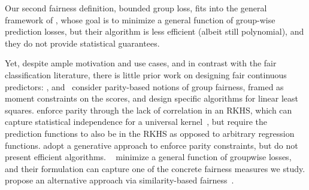 \documentclass{article}
\begin{document}
Our second fairness definition, bounded group loss, fits into the general framework
of \citet{alabi2018unleashing}, whose goal is to minimize a general function of group-wise prediction losses, but their algorithm is less efficient (albeit still polynomial), and they do not provide statistical guarantees.

%

\iffalse
Yet, despite ample motivation and use cases, and in contrast with the fair classification literature, there is little prior work on designing fair continuous predictors: \citet{CaldersEtAl13},  \citet{johnson2016impartial} and~\citet{komiyama2018nonconvex} consider parity-based notions of group fairness, framed as moment constraints on the scores, and design specific algorithms for linear least squares. \citet{perez2017fair} enforce parity through the lack of correlation in an RKHS, which can capture statistical independence for a universal kernel~\citep{gretton2005measuring}, but require the prediction functions to also be in the RKHS as opposed to arbitrary regression functions. \citet{fukuchi2015prediction} adopt a generative approach to enforce parity constraints, but do not present efficient algorithms. ~\citet{alabi2018unleashing} minimize a general function of groupwise losses, and their formulation can capture one of the concrete fairness measures we study.  \citet{berk2017convex} propose an alternative approach via similarity-based fairness~\citep{dwork12}.
%
\end{document}
